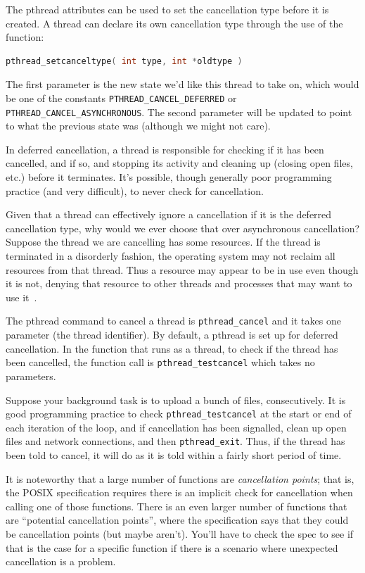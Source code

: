 \documentclass[a4paper]{report}
\begin{document}
\begin{appendices}
The pthread attributes can be used to set the cancellation type before it is created. A thread can declare its own cancellation type through the use of the function:
\begin{lstlisting}[language=C]
pthread_setcanceltype( int type, int *oldtype )
\end{lstlisting}

The first parameter is the new state we'd like this thread to take on, which would be one of the constants \texttt{PTHREAD\_CANCEL\_DEFERRED} or \texttt{PTHREAD\_CANCEL\_ASYNCHRONOUS}. The second parameter will be updated to point to what the previous state was (although we might not care).

In deferred cancellation, a thread is responsible for checking if it has been cancelled, and if so, and stopping its activity and cleaning up (closing open files, etc.) before it terminates. It's possible, though generally poor programming practice (and very difficult), to never check for cancellation.

Given that a thread can effectively ignore a cancellation if it is the deferred cancellation type, why would we ever choose that over asynchronous cancellation? Suppose the thread we are cancelling has some resources. If the thread is terminated in a disorderly fashion, the operating system may not reclaim all resources from that thread. Thus a resource may appear to be in use even though it is not, denying that resource to other threads and processes that may want to use it~\cite{osc}.

The pthread command to cancel a thread is \texttt{pthread\_cancel} and it takes one parameter (the thread identifier). By default, a pthread is set up for deferred cancellation. In the function that runs as a thread, to check if the thread has been cancelled, the function call is \texttt{pthread\_testcancel} which takes no parameters.

Suppose your background task is to upload a bunch of files, consecutively. It is good programming practice to check \texttt{pthread\_testcancel} at the start or end of each iteration of the loop, and if cancellation has been signalled, clean up open files and network connections, and then \texttt{pthread\_exit}. Thus, if the thread has been told to cancel, it will do as it is told within a fairly short period of time.

It is noteworthy that a large number of functions are \textit{cancellation points}; that is, the POSIX specification requires there is an implicit check for cancellation when calling one of those functions. There is an even larger number of functions that are ``potential cancellation points'', where the specification says that they could be cancellation points (but maybe aren't). You'll have to check the spec to see if that is the case for a specific function if there is a scenario where unexpected cancellation is a problem.


\end{appendices}
\end{document}
